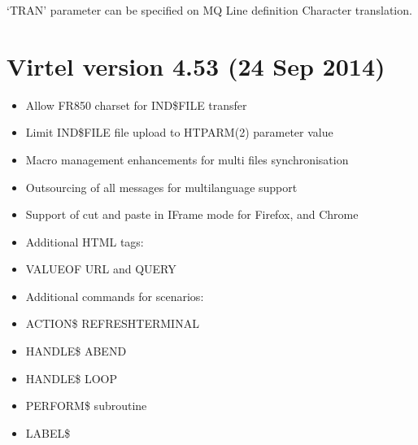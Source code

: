 \documentclass[letterpaper,10pt,english]{sphinxmanual}
\begin{document}
\sphinxAtStartPar
{}

\sphinxAtStartPar
‘TRAN’ parameter can be specified on MQ Line definition \sphinxhyphen{} Character translation.


\section{Virtel version 4.53 (24 Sep 2014)}
\label{\detokenize{Installation_Guide:virtel-version-4-53-24-sep-2014}}
\sphinxAtStartPar
{}
\begin{itemize}
\item {} 
\sphinxAtStartPar
Allow FR\sphinxhyphen{}850 charset for IND\$FILE transfer

\item {} 
\sphinxAtStartPar
Limit IND\$FILE file upload to HTPARM(2) parameter value

\item {} 
\sphinxAtStartPar
Macro management enhancements for multi files synchronisation

\item {} 
\sphinxAtStartPar
Outsourcing of all messages for multi\sphinxhyphen{}language support

\item {} 
\sphinxAtStartPar
Support of cut and paste in I\sphinxhyphen{}Frame mode for Firefox, and Chrome

\item {} 
\sphinxAtStartPar
Additional HTML tags:

\item {} 
\sphinxAtStartPar
VALUE\sphinxhyphen{}OF URL and QUERY

\end{itemize}

\sphinxAtStartPar
{}
\begin{itemize}
\item {} 
\sphinxAtStartPar
Additional commands for scenarios:

\item {} 
\sphinxAtStartPar
ACTION\$ REFRESH\sphinxhyphen{}TERMINAL

\item {} 
\sphinxAtStartPar
HANDLE\$ ABEND

\item {} 
\sphinxAtStartPar
HANDLE\$ LOOP

\item {} 
\sphinxAtStartPar
PERFORM\$ subroutine

\item {} 
\sphinxAtStartPar
LABEL\$

\end{itemize}
\end{document}
